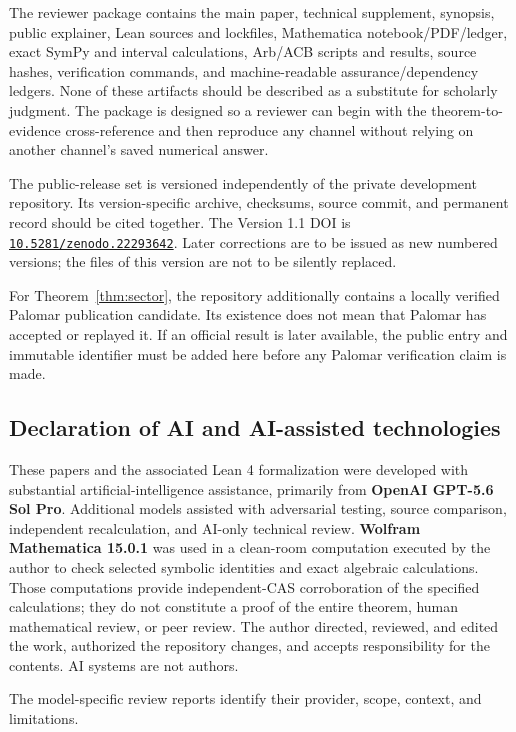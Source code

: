 \documentclass[12pt]{article}
\begin{document}
The reviewer package contains the main paper, technical supplement, synopsis,
public explainer, Lean sources and lockfiles, Mathematica notebook/PDF/ledger,
exact SymPy and interval calculations, Arb/ACB scripts and results, source
hashes, verification commands, and machine-readable assurance/dependency
ledgers.  None of these artifacts should be described as a substitute for
scholarly judgment.  The package is designed so a reviewer can begin with
the theorem-to-evidence cross-reference and then reproduce any channel
without relying on another channel's saved numerical answer.

The public-release set is versioned independently of the private development
repository.  Its version-specific archive, checksums, source commit, and
permanent record should be cited together.  The Version 1.1 DOI is
\href{https://doi.org/10.5281/zenodo.22293642}{\texttt{10.5281/zenodo.22293642}}.
Later corrections are to be issued as new numbered versions; the files of
this version are not to be silently replaced.

For Theorem~\ref{thm:sector}, the repository additionally contains a locally
verified Palomar publication candidate.  Its existence does not mean that
Palomar has accepted or replayed it.  If an official result is later
available, the public entry and immutable identifier must be added here
before any Palomar verification claim is made.

\subsection*{Declaration of AI and AI-assisted technologies}
These papers and the associated Lean 4 formalization were developed with
substantial artificial-intelligence assistance, primarily from
\textbf{OpenAI GPT-5.6 Sol Pro}.  Additional models assisted with adversarial
testing, source comparison, independent recalculation, and AI-only technical
review.  \textbf{Wolfram Mathematica 15.0.1} was used in a clean-room
computation executed by the author to check selected symbolic identities and
exact algebraic calculations.  Those computations provide independent-CAS
corroboration of the specified calculations; they do not constitute a proof
of the entire theorem, human mathematical review, or peer review.  The author
directed, reviewed, and edited the work, authorized the repository changes,
and accepts responsibility for the contents.  AI systems are not authors.

The model-specific review reports identify their provider, scope, context,
and limitations.
\end{document}
